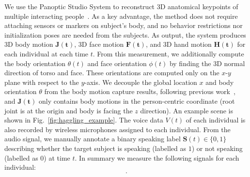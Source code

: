 We use the Panoptic Studio System to reconstruct 3D anatomical keypoints of multiple interacting people~\cite{joo2017panoptic, joo2018}. As a key advantage, the method does not require attaching sensors or markers on subject's body, and no behavior restrictions nor initialization poses are needed from the subjects. As output, the system produces 3D body motion $\mathbf{J(t)}$, 3D face motion $\mathbf{F(t)}$, and 3D hand motion $\mathbf{H(t)}$ for each individual at each time $t$. From this measurement, we additionally compute the body orientation $\theta(t)$ and face orientation $\phi(t)$ by finding the 3D normal direction of torso and face. These orientations are computed only on the $x$-$y$ plane with respect to the $y$-axis. We decouple the global location $x$ and body orientation $\theta$ from the body motion capture results, following previous work~\cite{jain2016structural, holden2016deep}, and $\mathbf{J(t)}$ only contains body motions in the person-centric coordinate (root joint is at the origin and body is facing the $z$ direction). An example scene is shown in Fig.~\ref{fig:haggling_example}. The voice data $V(t)$ of each individual is also recorded by wireless microphones assigned to each individual. From the audio signal, we manually annotate a binary speaking label $\mathbf{S}(t) \in \{0,1\}$ describing whether the target subject is speaking (labelled as $1$) or not speaking (labelled as $0$) at time $t$. In summary we measure the following signals for each individual:
\begin{equation}
[ \mathbf{x}, \boldsymbol{\theta}, \boldsymbol{\phi}, \mathbf{J}, \mathbf{F}, \mathbf{H}, \mathbf{V}, \mathbf{S} ].
\label{equation:measurement}
\end{equation}





